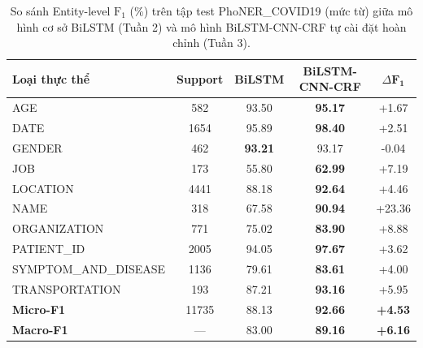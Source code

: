 \begin{table}[t]
\centering
\small
\begin{tabular}{lcccc}
\hline
\textbf{Loại thực thể} & \textbf{Support} & \textbf{BiLSTM} & \textbf{BiLSTM-CNN-CRF} & $\Delta \mathbf{F_1}$ \\
\hline
AGE                 & 582   & 93.50 & \textbf{95.17} & +1.67 \\
DATE                & 1654  & 95.89 & \textbf{98.40} & +2.51 \\
GENDER              & 462   & \textbf{93.21} & 93.17 & -0.04 \\
JOB                 & 173   & 55.80 & \textbf{62.99} & +7.19 \\
LOCATION            & 4441  & 88.18 & \textbf{92.64} & +4.46 \\
NAME                & 318   & 67.58 & \textbf{90.94} & +23.36 \\
ORGANIZATION        & 771   & 75.02 & \textbf{83.90} & +8.88 \\
PATIENT\_ID         & 2005  & 94.05 & \textbf{97.67} & +3.62 \\
SYMPTOM\_AND\_DISEASE & 1136 & 79.61 & \textbf{83.61} & +4.00 \\
TRANSPORTATION      & 193   & 87.21 & \textbf{93.16} & +5.95 \\
\hline
\textbf{Micro-F1}   & 11735 & 88.13 & \textbf{92.66} & \textbf{+4.53} \\
\textbf{Macro-F1}   & ---   & 83.00 & \textbf{89.16} & \textbf{+6.16} \\
\hline
\end{tabular}
\caption{So sánh Entity-level $\text{F}_1$ (\%) trên tập test PhoNER\_COVID19 (mức từ) giữa mô hình cơ sở BiLSTM (Tuần 2) và mô hình BiLSTM-CNN-CRF tự cài đặt hoàn chỉnh (Tuần 3).}
\label{tab:bilstm-milestone}
\end{table}
